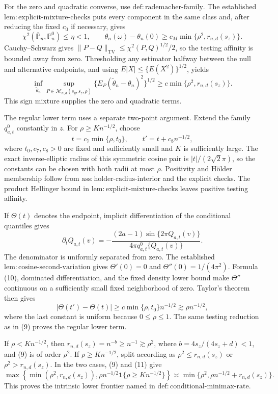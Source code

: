 For the zero and quadratic converse, use \(\mathrm{def{:}rademacher\text{-}family}\).  The established \(\mathrm{lem{:}explicit\text{-}mixture\text{-}checks}\) puts every component in the same class and, after reducing the fixed \(c_0\) if necessary, gives
\[
\chi^2(\overline{\mathbb P}_n,\mathbb P_n^0)\le\eta<1,
\qquad
\theta_n(\omega)-\theta_n(0)
\ge c_M\min\{\rho^2,r_{n,d}(s_z)\}. \tag{8}
\]
Cauchy--Schwarz gives \(\|P-Q\|_{\mathrm{TV}}\le\chi^2(P,Q)^{1/2}/2\), so the testing affinity is bounded away from zero.  Thresholding any estimator halfway between the null and alternative endpoints, and using \(E|X|\le\{E(X^2)\}^{1/2}\), yields
\[
\inf_{\widetilde\theta_n}\sup_{P\in\mathcal M_{n,d}(s_y,s_z,\rho)}
\{E_P(\widetilde\theta_n-\theta_n)^2\}^{1/2}
\ge c\min\{\rho^2,r_{n,d}(s_z)\}. \tag{9}
\]
This sign mixture supplies the zero and quadratic terms.

The regular lower term uses a separate two-point argument.  Extend the family \(q_{a,t}^{0}\) constantly in \(z\).  For \(\rho\ge K n^{-1/2}\), choose
\[
t=c_7\min\{\rho,t_0\},
\qquad t'=t+c_8n^{-1/2},
\]
where \(t_0,c_7,c_8>0\) are fixed and sufficiently small and \(K\) is sufficiently large.  The exact inverse-elliptic radius of this symmetric cosine pair is \(|t|/(2\sqrt2\pi)\), so the constants can be chosen with both radii at most \(\rho\).  Positivity and H\"older membership follow from \(\mathrm{ass{:}holder\text{-}radius\text{-}interior}\) and the explicit checks.  The product Hellinger bound in \(\mathrm{lem{:}explicit\text{-}mixture\text{-}checks}\) leaves positive testing affinity.

If \(\Theta(t)\) denotes the endpoint, implicit differentiation of the conditional quantiles gives
\[
\partial_tQ_{a,t}(v)
=-\frac{(2a-1)\sin\{2\pi Q_{a,t}(v)\}}
{4\pi q_{a,t}^{0}\{Q_{a,t}(v)\}}. \tag{10}
\]
The denominator is uniformly separated from zero.  The established \(\mathrm{lem{:}cosine\text{-}second\text{-}variation}\) gives \(\Theta'(0)=0\) and \(\Theta''(0)=1/(4\pi^2)\).  Formula (10), dominated differentiation, and the fixed density lower bound make \(\Theta''\) continuous on a sufficiently small fixed neighborhood of zero.  Taylor's theorem then gives
\[
|\Theta(t')-\Theta(t)|
\ge c\min\{\rho,t_0\}n^{-1/2}
\gtrsim\rho n^{-1/2}, \tag{11}
\]
where the last constant is uniform because \(0\le\rho\le1\).  The same testing reduction as in (9) proves the regular lower term.

If \(\rho<K n^{-1/2}\), then \(r_{n,d}(s_z)=n^{-b}\ge n^{-1}\gtrsim\rho^2\), where \(b=4s_z/(4s_z+d)<1\), and (9) is of order \(\rho^2\).  If \(\rho\ge K n^{-1/2}\), split according as \(\rho^2\le r_{n,d}(s_z)\) or \(\rho^2>r_{n,d}(s_z)\).  In the two cases, (9) and (11) give
\[
\max\!\left\{\min(\rho^2,r_{n,d}(s_z)),
\rho n^{-1/2}\mathbf1\{\rho\ge Kn^{-1/2}\}\right\}
\asymp\min\{\rho^2,\rho n^{-1/2}+r_{n,d}(s_z)\}. \tag{12}
\]
This proves the intrinsic lower frontier named in \(\mathrm{def{:}conditional\text{-}minimax\text{-}rate}\).


